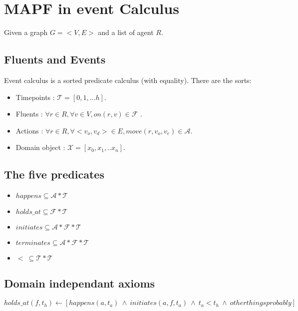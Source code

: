 \section{MAPF in event Calculus}\label{sec:introduction}

Given a graph $G = <V,E>$ and a list of agent $R$.

\subsection{Fluents and Events}

Event calculus is a sorted predicate calculus (with equality). There are the sorts:

\begin{itemize}
  \item Timepoints : $\mathcal{T} = [0, 1, ... h]$.
  \item Fluents : $\forall r \in R, \forall v \in V, on(r,v) \in \mathcal{F}$ .
  \item Actions : $\forall r \in R, \forall <v_o,v_d> \in E, move(r,v_o,v_e) \in \mathcal{A}$.
  \item Domain object : $\mathcal{X} = [x_0, x_1, .. x_n]$.
\end{itemize}

\subsection{The five predicates}

\begin{itemize}
  \item $happens \subseteq \mathcal{A}*\mathcal{T}$
  \item $holds\_at \subseteq \mathcal{F}*\mathcal{T}$
  \item $initiates \subseteq \mathcal{A}*\mathcal{F}*\mathcal{T}$
  \item $terminates \subseteq \mathcal{A}*\mathcal{F}*\mathcal{T}$
  \item $<\ \subseteq \mathcal{T}*\mathcal{T}$
\end{itemize}

\subsection{Domain independant axioms}

$$holds\_at(f,t_h) \leftarrow [happens(a,t_a)\ \land\ initiates(a,f,t_a)\ \land\ t_a<t_h\ \land\ other things probably]$$
